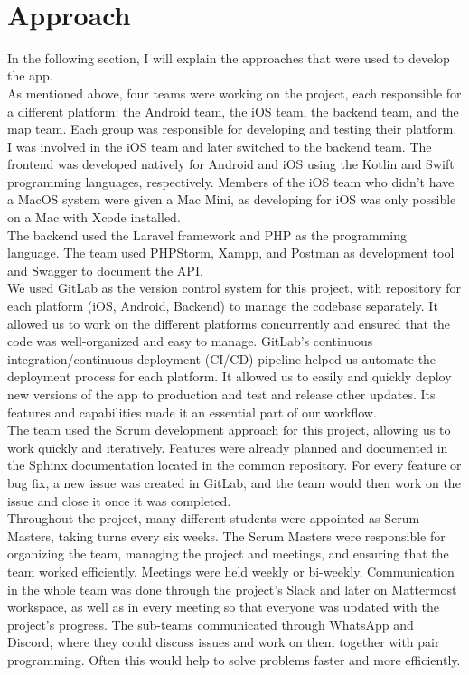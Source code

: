\documentclass[sf-font,usefira,english]{uulm/sp/article}
\begin{document}
\\

\section{Approach}

In the following section, I will explain the approaches that were used to develop the app.\\

As mentioned above, four teams were working on the project, each responsible for a different platform:
the Android team, the iOS team, the backend team, and the map team.
Each group was responsible for developing and testing their platform.\\

I was involved in the iOS team and later switched to the backend team.
The frontend was developed natively for Android and iOS using the Kotlin and Swift programming languages, respectively.
Members of the iOS team who didn’t have a MacOS system were given a Mac Mini, as developing for iOS was only possible on a Mac with Xcode installed.\\
The backend used the Laravel framework and PHP as the programming language.
The team used PHPStorm, Xampp, and Postman as development tool and Swagger to document the API.\\

We used GitLab as the version control system for this project, with repository for each platform (iOS, Android, Backend) to manage the codebase separately.
It allowed us to work on the different platforms concurrently and ensured that the code was well-organized and easy to manage.
GitLab’s continuous integration/continuous deployment (CI/CD) pipeline helped us automate the deployment process for each platform.
It allowed us to easily and quickly deploy new versions of the app to production and test and release other updates.
Its features and capabilities made it an essential part of our workflow.\\

The team used the Scrum development approach for this project, allowing us to work quickly and iteratively.
Features were already planned and documented in the Sphinx documentation located in the common repository.
For every feature or bug fix, a new issue was created in GitLab, and the team would then work on the issue and close it once it was completed.\\

Throughout the project, many different students were appointed as Scrum Masters, taking turns every six weeks.
The Scrum Masters were responsible for organizing the team, managing the project and meetings, and ensuring that the team worked efficiently.
Meetings were held weekly or bi-weekly.
Communication in the whole team was done through the project's Slack and later on Mattermost workspace, as well as in every meeting so that everyone was updated with the project's progress.
The sub-teams communicated through WhatsApp and Discord, where they could discuss issues and work on them together with pair programming.
Often this would help to solve problems faster and more efficiently.
\end{document}
